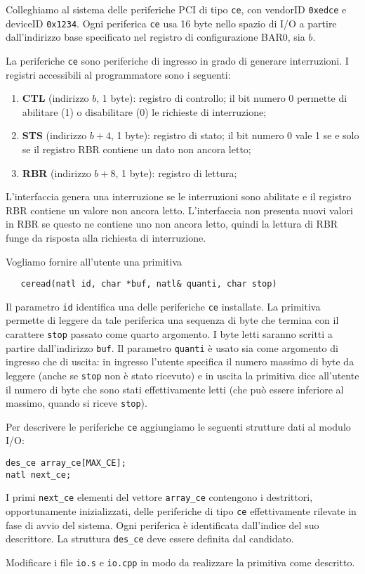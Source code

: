 Colleghiamo al sistema delle periferiche PCI di tipo \verb|ce|, con vendorID \verb|0xedce| e deviceID \verb|0x1234|.
Ogni periferica \verb|ce| usa 16 byte nello spazio di I/O a partire dall'indirizzo base specificato nel
registro di configurazione BAR0, sia $b$.

La periferiche \verb|ce| sono periferiche di ingresso in grado di generare interruzioni.
I registri accessibili al programmatore sono i seguenti:
\begin{enumerate}
  \item {\bf CTL} (indirizzo $b$, 1 byte): registro di controllo; il bit numero 0 permette di abilitare (1) o disabilitare (0)
    le richieste di interruzione;
  \item {\bf STS} (indirizzo $b+4$, 1 byte): registro di stato; il bit numero 0 vale 1 se e solo se il registro RBR contiene
    un dato non ancora letto;
  \item {\bf RBR} (indirizzo $b+8$, 1 byte): registro di lettura;
\end{enumerate}
L'interfaccia genera una interruzione se le interruzioni sono abilitate e il registro RBR contiene un valore non ancora letto.
L'interfaccia non presenta nuovi valori in RBR se questo ne contiene uno non ancora letto, quindi la lettura di RBR funge
da risposta alla richiesta di interruzione.

Vogliamo fornire all'utente una primitiva 
\begin{verbatim}
   ceread(natl id, char *buf, natl& quanti, char stop)
\end{verbatim}
Il parametro \verb|id| identifica una delle periferiche \verb|ce| installate.
La primitiva permette di leggere da tale periferica una sequenza di byte che termina con il carattere \verb|stop| passato come quarto
argomento. I byte letti saranno scritti a partire dall'indirizzo \verb|buf|. Il parametro \verb|quanti| \`e usato
sia come argomento di ingresso che di uscita: in ingresso l'utente specifica il numero massimo di byte da leggere 
(anche se \verb|stop| non \`e stato ricevuto) e in uscita la primitiva dice all'utente il numero di byte che sono stati
effettivamente letti (che pu\`o essere inferiore al massimo, quando si riceve \verb|stop|).

Per descrivere le periferiche \verb|ce| aggiungiamo le seguenti strutture dati al modulo I/O:
\begin{verbatim}
des_ce array_ce[MAX_CE];
natl next_ce;
\end{verbatim}
I primi \verb|next_ce| elementi del vettore \verb|array_ce| contengono i destrittori, opportunamente inizializzati,
delle periferiche di tipo \verb|ce| effettivamente rilevate in fase di avvio del sistema. Ogni periferica \`e identificata
dall'indice del suo descrittore. La struttura \verb|des_ce| deve essere definita dal candidato.

Modificare i file \verb|io.s| e \verb|io.cpp| in modo da realizzare la primitiva come descritto.
